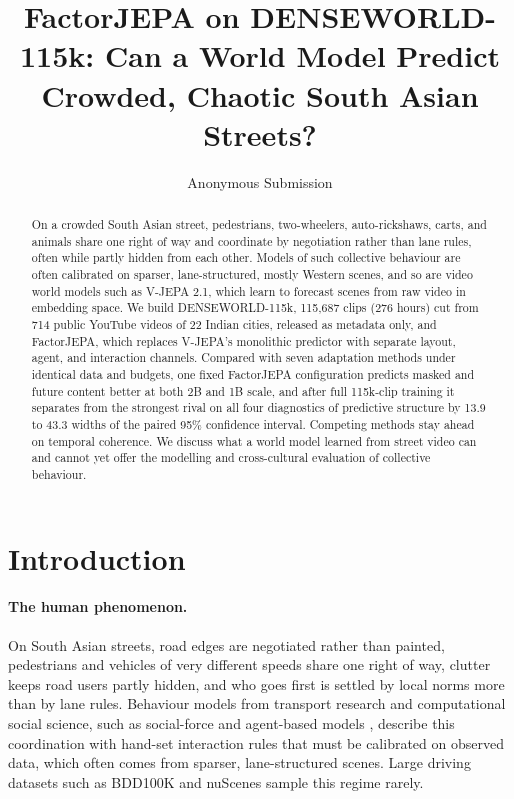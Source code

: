 \documentclass[letterpaper]{article} %
\title{FactorJEPA on DENSEWORLD-115k: Can a World Model Predict Crowded, Chaotic South Asian Streets?}
\author{Anonymous Submission}
\begin{document}
\maketitle

\begin{abstract}
On a crowded South Asian street, pedestrians, two-wheelers, auto-rickshaws, carts, and animals share one right of way and coordinate by negotiation rather than lane rules, often while partly hidden from each other. Models of such collective behaviour are often calibrated on sparser, lane-structured, mostly Western scenes, and so are video world models such as V-JEPA 2.1, which learn to forecast scenes from raw video in embedding space. We build DENSEWORLD-115k, 115,687 clips (276 hours) cut from 714 public YouTube videos of 22 Indian cities, released as metadata only, and FactorJEPA, which replaces V-JEPA's monolithic predictor with separate layout, agent, and interaction channels. Compared with seven adaptation methods under identical data and budgets, one fixed FactorJEPA configuration predicts masked and future content better at both 2B and 1B scale, and after full 115k-clip training it separates from the strongest rival on all four diagnostics of predictive structure by 13.9 to 43.3 widths of the paired 95\% confidence interval. Competing methods stay ahead on temporal coherence. We discuss what a world model learned from street video can and cannot yet offer the modelling and cross-cultural evaluation of collective behaviour.
\end{abstract}

\begin{links}
\end{links}

\section{Introduction}

\paragraph{The human phenomenon.} On South Asian streets, road edges are negotiated rather than painted, pedestrians and vehicles of very different speeds share one right of way, clutter keeps road users partly hidden, and who goes first is settled by local norms more than by lane rules. Behaviour models from transport research and computational social science, such as social-force and agent-based models \cite{helbing1995social}, describe this coordination with hand-set interaction rules that must be calibrated on observed data, which often comes from sparser, lane-structured scenes. Large driving datasets such as BDD100K \cite{yu2020bdd100k} and nuScenes \cite{caesar2020nuscenes} sample this regime rarely.
\end{document}
